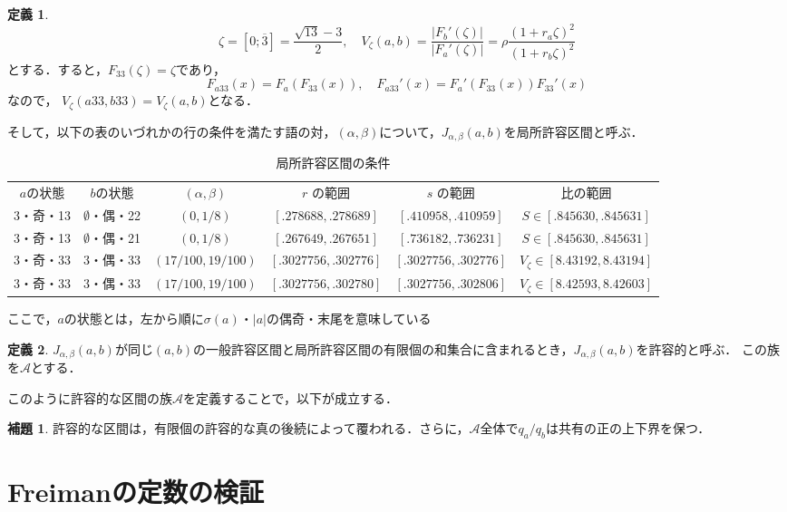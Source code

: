 \documentclass[10pt,a4paper]{ujarticle}
\theoremstyle{definition}
\newtheorem{lemma}{補題}
\newtheorem{definition}{定義}
\begin{document}
\begin{definition}
    \[
    \zeta = [0; \overline{3}] = \frac{\sqrt{13} - 3}{2}, \quad 
    V_\zeta(a,b) = \frac{|F_b'(\zeta)|}{|F_a'(\zeta)|} = \rho \frac{(1 + r_a\zeta)^2}{(1 + r_b\zeta)^2}
    \]
    とする．すると，$F_{33}(\zeta) = \zeta$であり，
    \[
    F_{a33}(x) = F_a(F_{33}(x)), \quad F_{a33}'(x) = F_a'(F_{33}(x)) F_{33}'(x)
    \]
    なので，
    $V_\zeta(a33, b33) = V_\zeta(a, b)$となる．

    そして，以下の表のいづれかの行の条件を満たす語の対，$(\alpha,\beta)$について，$J_{\alpha, \beta}(a,b)$を局所許容区間と呼ぶ．
    \begin{table}[htbp]
        \centering\footnotesize
        \begin{tabular}{cccccc}
        \toprule
        $a$の状態 & $b$の状態 & $(\alpha,\beta)$ & $r$ の範囲 & $s$ の範囲 & 比の範囲\\
        $3$・奇・13 & $\emptyset$・偶・22 & $(0,1/8)$ & $[.278688,.278689]$ & $[.410958,.410959]$ & $S \in [.845630,.845631]$\\
        $3$・奇・13 & $\emptyset$・偶・21 & $(0,1/8)$ & $[.267649,.267651]$ & $[.736182,.736231]$ & $S \in [.845630,.845631]$\\
        $3$・奇・33 & $3$・偶・33 & $(17/100,19/100)$ & $[.3027756,.302776]$ & $[.3027756,.302776]$ & $V_\zeta \in [8.43192,8.43194]$\\
        $3$・奇・33 & $3$・偶・33 & $(17/100,19/100)$ & $[.3027756,.302780]$ & $[.3027756,.302806]$ & $V_\zeta \in [8.42593,8.42603]$\\
        \bottomrule
        \end{tabular}
        \caption{局所許容区間の条件}
    \end{table}
    ここで，$a$の状態とは，左から順に$\sigma(a)$・$|a|$の偶奇・末尾を意味している
\end{definition}
\begin{definition}
    $J_{\alpha, \beta}(a, b)$が同じ$(a,b)$の一般許容区間と局所許容区間の有限個の和集合に含まれるとき，$J_{\alpha, \beta}(a, b)$を許容的と呼ぶ．
    この族を$\mathcal{A}$とする．
\end{definition}
このように許容的な区間の族$\mathcal{A}$を定義することで，以下が成立する．
\begin{lemma}
    \label{lem3}
    許容的な区間は，有限個の許容的な真の後続によって覆われる．さらに，$\mathcal{A}$全体で$q_a/q_b$は共有の正の上下界を保つ．
\end{lemma}

\section{Freimanの定数の検証}
\end{document}
